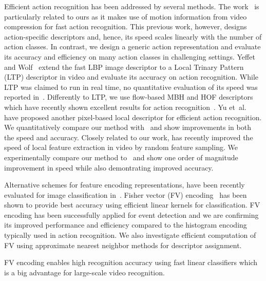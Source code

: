 \documentclass[10pt,twocolumn,letterpaper]{article}
\begin{document}


Efficient action recognition has been addressed by several
methods. The work~\cite{mpeg3,mpeg2,mpeg1} is particularly
related to ours as it makes use of motion information from video compression for fast action recognition. This previous work,
however, designs action-specific descriptors and, hence, its
speed scales linearly with the number of action classes. In
contrast, we design a generic action representation and evaluate its accuracy and efficiency on many action classes in
challenging settings.
Yeffet and Wolf~\cite{Yeffet09} extend the fast LBP image
descriptor to a Local Trinary Pattern (LTP) descriptor in video
and evaluate its accuracy on action recognition. While LTP was
claimed to run in real time, no quantitative evaluation of its
speed was reported in~\cite{Yeffet09}. Differently to LTP, we
use flow-based MBH and HOF descriptors which have recently shown excellent results for action recognition~\cite{Wang12}. Yu
et~al.~\cite{Yu10} have proposed another pixel-based local
descriptor for efficient action recognition. We quantitatively
compare our method with~\cite{Yu10} and show improvements in
both the speed and accuracy.
Closely related to our work, \cite{Feng13} has 
recently improved the speed of local feature extraction in video
by random feature sampling.
We experimentally compare our method to~\cite{Feng13}
and show one order of magnitude improvement in speed while 
also demontrating improved accuracy.


Alternative schemes for feature encoding
representations,
have been recently evaluated for image classification
in~\cite{Chatfield11}.
Fisher vector (FV) encoding~\cite{Perronnin10} has been shown to provide best accuracy using efficient linear kernels for
classification. FV encoding has been successfully applied for
event detection \cite{Revaud13} and we are confirming its
improved performance and efficiency compared to the
histogram encoding typically used in action recognition. We also investigate efficient computation of FV using approximate
nearest neighbor methods for descriptor assignment.

FV encoding enables high recognition accuracy using fast linear
classifiers which is a big advantage for large-scale video
recognition. 
\end{document}
